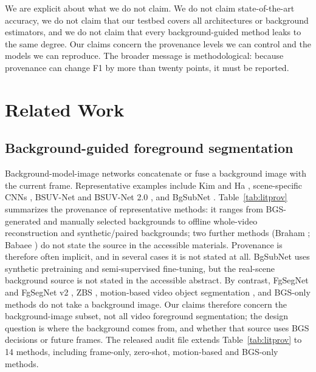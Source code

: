 \documentclass[sn-mathphys-num,iicol]{sn-jnl}
\begin{document}
We are explicit about what we do not claim. We do not claim state-of-the-art accuracy, we
do not claim that our testbed covers all architectures or background estimators,
and we do not claim that every background-guided method leaks to the same
degree. Our claims concern the provenance levels we can control and the
models we can reproduce. The broader message is methodological: because
provenance can change F1 by more than twenty points, it must be reported.

\section{Related Work}\label{sec:related}

\subsection{Background-guided foreground segmentation}
Background-model-image networks concatenate or fuse a background image with the
current frame. Representative examples include Kim and Ha \cite{kimbgsub2020},
scene-specific CNNs \cite{braham2016,babaee2018}, BSUV-Net \cite{bsuvnet2020}
and BSUV-Net 2.0 \cite{bsuvnet2021}, and BgSubNet \cite{bgsubnet2024}.
Table~\ref{tab:litprov} summarizes the provenance of representative methods: it
ranges from BGS-generated and manually selected backgrounds to offline
whole-video reconstruction and synthetic/paired backgrounds; two further
methods (Braham \cite{braham2016}; Babaee \cite{babaee2018}) do not state the source in the accessible materials.
Provenance is therefore often implicit, and in several cases it is not stated at all.
BgSubNet uses synthetic pretraining and semi-supervised fine-tuning, but the
real-scene background source is not stated in the accessible abstract.
By contrast, FgSegNet and FgSegNet v2 \cite{fgsegnet2018,fgsegnetv2_2020}, ZBS
\cite{zbs2023}, motion-based video object segmentation
\cite{motionasoption2025}, and BGS-only methods \cite{sttrpca2025,ganbgs2025} do
not take a background image. Our claims therefore concern the background-image
subset, not all video foreground segmentation; the design question is where the
background comes from, and whether that source uses BGS decisions or future
frames. The released audit file extends Table~\ref{tab:litprov} to 14 methods,
including frame-only, zero-shot, motion-based and BGS-only methods.
\end{document}
